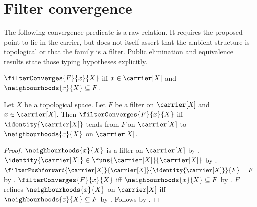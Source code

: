 \section{Filter convergence}







The following convergence predicate is a raw relation.  It requires the
proposed point to lie in the carrier, but does not itself assert that the
ambient structure is topological or that the family is a filter.  Public
elimination and equivalence results state those typing hypotheses explicitly.

\begin{definition}\label{filter_converges}
    $\filterConverges{F}{x}{X}$ iff $x\in\carrier[X]$ and
        $\neighbourhoods{x}{X}\subseteq F$.
\end{definition}

\begin{theorem}\label{filter_converges_iff_identity_tendsto}
    Let $X$ be a topological space.
    Let $F$ be a filter on $\carrier[X]$ and $x\in\carrier[X]$.
    Then $\filterConverges{F}{x}{X}$ iff
        $\identity{\carrier[X]}$ tends from $F$ on $\carrier[X]$ to
            $\neighbourhoods{x}{X}$ on $\carrier[X]$.
\end{theorem}
\begin{proof}
    $\neighbourhoods{x}{X}$ is a filter on $\carrier[X]$ by
        .
    $\identity{\carrier[X]}\in
        \funs{\carrier[X]}{\carrier[X]}$ by .
    $\filterPushforward{\carrier[X]}{\carrier[X]}
        {\identity{\carrier[X]}}{F}=F$ by
        .
    $\filterConverges{F}{x}{X}$ iff
        $\neighbourhoods{x}{X}\subseteq F$ by
        .
    $F$ refines $\neighbourhoods{x}{X}$ on $\carrier[X]$ iff
        $\neighbourhoods{x}{X}\subseteq F$ by
        .
    Follows by .
\end{proof}

